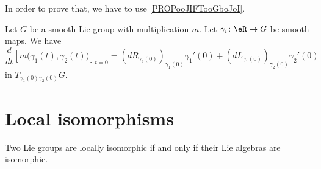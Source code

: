 In order to prove that, we have to use \ref{PROPooJIFTooGboJoI}.

\begin{proposition}	\label{PROPooWKWLooOOrOZs}
	Let \( G\) be a smooth Lie group with multiplication \( m\). Let \(\gamma_i \colon \eR\to G  \) be smooth maps. We have
	\begin{equation}
		\frac{d}{dt} \left[ m\big( \gamma_1(t),\gamma_2(t) \big)  \right]_{t=0}=(dR_{\gamma_2(0)})_{\gamma_1(0)}\gamma_1'(0)+(dL_{\gamma_1(0)})_{\gamma_2(0)}\gamma_2'(0)
	\end{equation}
	in \( T_{\gamma_1(0)\gamma_2(0)}G\).
\end{proposition}


\section{Local isomorphisms}


\begin{theorem} \label{tho:loc_isom}
	Two Lie groups are locally isomorphic if and only if their Lie algebras are isomorphic.
\end{theorem}

